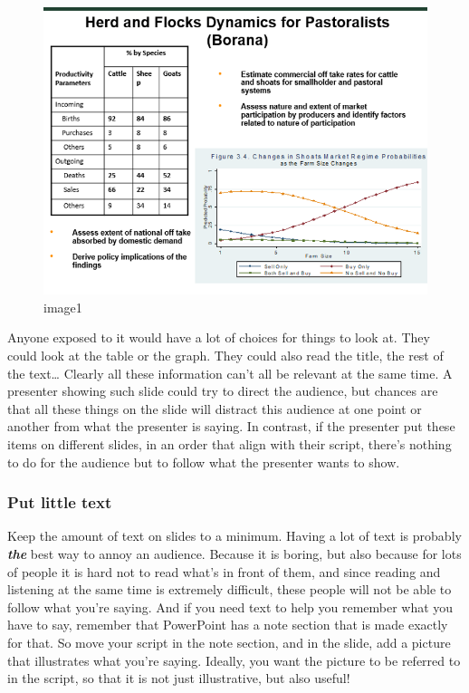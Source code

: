 \documentclass[
  titlepage]{book}
\begin{document}
\begin{figure}
\centering
\includegraphics{img/audience_slide1.png}
\caption{image1}
\end{figure}

Anyone exposed to it would have a lot of choices for things to look at. They could look at the table or the graph. They could also read the title, the rest of the text\ldots{} Clearly all these information can't all be relevant at the same time. A presenter showing such slide could try to direct the audience, but chances are that all these things on the slide will distract this audience at one point or another from what the presenter is saying. In contrast, if the presenter put these items on different slides, in an order that align with their script, there's nothing to do for the audience but to follow what the presenter wants to show.

\hypertarget{put-little-text}{%
\subsubsection{Put little text}\label{put-little-text}}

Keep the amount of text on slides to a minimum. Having a lot of text is probably \textbf{\emph{the}} best way to annoy an audience. Because it is boring, but also because for lots of people it is hard not to read what's in front of them, and since reading and listening at the same time is extremely difficult, these people will not be able to follow what you're saying. And if you need text to help you remember what you have to say, remember that PowerPoint has a note section that is made exactly for that. So move your script in the note section, and in the slide, add a picture that illustrates what you're saying. Ideally, you want the picture to be referred to in the script, so that it is not just illustrative, but also useful!
\end{document}
